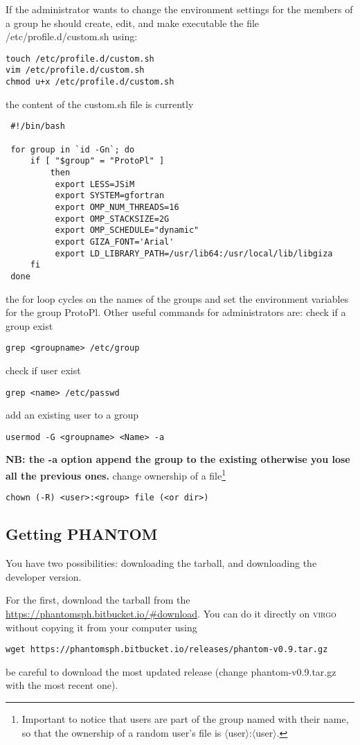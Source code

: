 \documentclass[10pt,a4paper,twoside]{article} %
\begin{document}
If the administrator wants to change the environment settings for the members of a group he should create, edit, and make executable the file /etc/profile.d/custom.sh using:
\begin{verbatim}
touch /etc/profile.d/custom.sh
vim /etc/profile.d/custom.sh
chmod u+x /etc/profile.d/custom.sh
\end{verbatim}
the content of the custom.sh file is currently
\begin{verbatim}
 #!/bin/bash 
 
 for group in `id -Gn`; do
     if [ "$group" = "ProtoPl" ] 
         then
          export LESS=JSiM
          export SYSTEM=gfortran
          export OMP_NUM_THREADS=16
          export OMP_STACKSIZE=2G
          export OMP_SCHEDULE="dynamic"
          export GIZA_FONT='Arial'
          export LD_LIBRARY_PATH=/usr/lib64:/usr/local/lib/libgiza
     fi
 done
\end{verbatim}
the for loop cycles on the names of the groups and set the environment variables for the group ProtoPl.
Other useful commands for administrators are: check if a group exist
\begin{verbatim}
grep <groupname> /etc/group
\end{verbatim}
check if user exist
\begin{verbatim}
grep <name> /etc/passwd
\end{verbatim}
add an existing user to a group
\begin{verbatim}
usermod -G <groupname> <Name> -a 
\end{verbatim}
\textbf{NB: the -a option append the group to the existing otherwise you lose all the previous ones.}
change ownership of a file\footnote{Important to notice that users are part of the group named with their name, so that the ownership of a random user's file is $\langle$user$\rangle$:$\langle$user$\rangle$.}
\begin{verbatim}
chown (-R) <user>:<group> file (<or dir>)
\end{verbatim}

\subsection{Getting PHANTOM}\label{getphant}
You have two possibilities: downloading the tarball, and downloading the developer version.

For the first, download the tarball from the \url{https://phantomsph.bitbucket.io/#download}. You can do it directly on \textsc{virgo} without copying it from your computer using 
\begin{verbatim}
wget https://phantomsph.bitbucket.io/releases/phantom-v0.9.tar.gz 
\end{verbatim}
be careful to download the most updated release (change phantom-v0.9.tar.gz with the most recent one).
\end{document}
